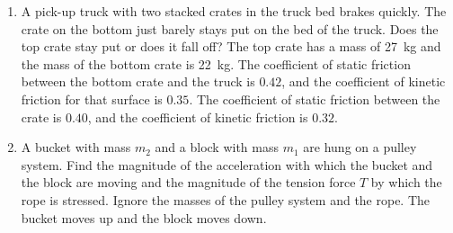 \documentclass{../../oss-apphys}
\begin{document}
\begin{enumerate}[leftmargin=15pt]
\item A pick-up truck with two stacked crates in the truck bed brakes quickly.
  The crate on the bottom just barely stays put on the bed of the truck. Does
  the top crate stay put or does it fall off? The top crate has a mass of
  \SI{27}{\kilo\gram} and the mass of the bottom crate is \SI{22}{\kilo\gram}.
  The coefficient of static friction between the bottom crate and the truck is
  $0.42$, and the coefficient of kinetic friction for that surface is $0.35$.
  The coefficient of static friction between the crate is $0.40$, and the
  coefficient of kinetic friction is $0.32$.
  \vspace{2in}

\item A bucket with mass $m_2$ and a block with mass $m_1$ are hung on a pulley
  system. Find the magnitude of the acceleration with which the bucket and the
  block are moving and the magnitude of the tension force $T$ by which the rope
  is stressed. Ignore the masses of the pulley system and the rope. The bucket
  moves up and the block moves down.
  \begin{center}
  \end{center}
\end{enumerate}
\end{document}
